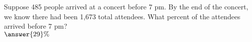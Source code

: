 \documentclass{ximera}
\author{David Kish}
\begin{document}
   \begin{exercise}
 Suppose 485 people arrived at a concert before 7 pm.  By the end of the concert, we know there had been 1,673 total attendees.  What percent of the attendees arrived before 7 pm? \\
 $\answer{29}\%$ \calcHW
 \end{exercise}
\end{document}
